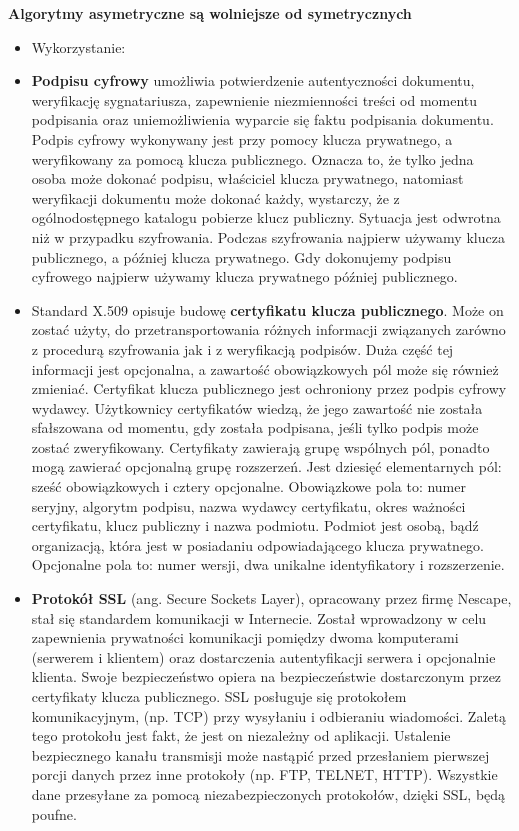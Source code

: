 \textbf{Algorytmy asymetryczne są wolniejsze od symetrycznych}

\begin{itemize}
	\setlength\itemsep{1pt}
	\item[] Wykorzystanie:
	\item \textbf{Podpisu cyfrowy} umożliwia potwierdzenie autentyczności dokumentu, weryfikację sygnatariusza, zapewnienie niezmienności treści od momentu podpisania oraz uniemożliwienia wyparcie się faktu podpisania dokumentu. Podpis cyfrowy wykonywany jest przy pomocy klucza prywatnego, a weryfikowany za pomocą klucza publicznego. Oznacza to, że tylko jedna osoba może dokonać podpisu, właściciel klucza prywatnego, natomiast weryfikacji dokumentu może dokonać każdy, wystarczy, że z ogólnodostępnego katalogu pobierze klucz publiczny. Sytuacja jest odwrotna niż w przypadku szyfrowania. Podczas szyfrowania najpierw używamy klucza publicznego, a później klucza prywatnego. Gdy dokonujemy podpisu cyfrowego najpierw używamy klucza prywatnego później publicznego.

	\item Standard X.509 opisuje budowę \textbf{certyfikatu klucza publicznego}. Może on zostać użyty, do przetransportowania różnych informacji związanych zarówno z procedurą szyfrowania jak i z weryfikacją podpisów. Duża część tej informacji jest opcjonalna, a zawartość obowiązkowych pól może się również zmieniać. Certyfikat klucza publicznego jest ochroniony przez podpis cyfrowy wydawcy. Użytkownicy certyfikatów wiedzą, że jego zawartość nie została sfałszowana od momentu, gdy została podpisana, jeśli tylko podpis może zostać zweryfikowany. Certyfikaty zawierają grupę wspólnych pól, ponadto mogą zawierać opcjonalną grupę rozszerzeń. Jest dziesięć elementarnych pól: sześć obowiązkowych i cztery opcjonalne. Obowiązkowe pola to: numer seryjny, algorytm podpisu, nazwa wydawcy certyfikatu, okres ważności certyfikatu, klucz publiczny i nazwa podmiotu. Podmiot jest osobą, bądź organizacją, która jest w posiadaniu odpowiadającego klucza prywatnego. Opcjonalne pola to: numer wersji, dwa unikalne identyfikatory i rozszerzenie. 

	\item \textbf{Protokół SSL} (ang. Secure Sockets Layer), opracowany przez firmę Nescape, stał się standardem komunikacji w Internecie. Został wprowadzony w celu zapewnienia prywatności komunikacji pomiędzy dwoma komputerami (serwerem i klientem) oraz dostarczenia autentyfikacji serwera i opcjonalnie  klienta. Swoje bezpieczeństwo opiera na bezpieczeństwie dostarczonym przez certyfikaty klucza publicznego. SSL posługuje się protokołem komunikacyjnym, (np. TCP) przy wysyłaniu i odbieraniu wiadomości. Zaletą tego protokołu jest fakt, że jest on niezależny od aplikacji. Ustalenie bezpiecznego kanału transmisji może nastąpić przed przesłaniem pierwszej porcji danych przez inne protokoły (np. FTP, TELNET, HTTP). Wszystkie dane przesyłane za pomocą niezabezpieczonych protokołów, dzięki SSL, będą poufne. 
\end{itemize}